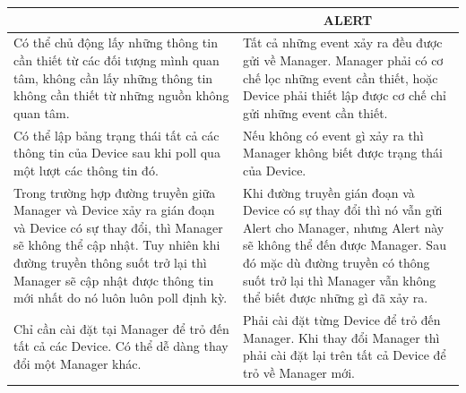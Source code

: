 \documentclass[12pt,oneside,a4paper]{article}
\begin{document}
\begin{longtable}{|p{8cm}|p{8cm}|}
\hline
\rowcolor[HTML]{EFEFEF} 
\multicolumn{1}{|c|}{\cellcolor[HTML]{EFEFEF}\textbf{POLL}}                                                                                                                                                                                                    & \multicolumn{1}{c|}{\cellcolor[HTML]{EFEFEF}\textbf{ALERT}}                                                                                                                                                                                   \\ \hline
Có thể chủ động lấy những thông tin cần thiết từ các đối tượng mình quan tâm, không cần lấy những thông tin không cần thiết từ những nguồn không quan tâm.                                                                                                     & Tất cả những event xảy ra đều được gửi về Manager. Manager phải có cơ chế lọc những event cần thiết, hoặc Device phải thiết lập được cơ chế chỉ gửi những event cần thiết.                                                                    \\ \hline
Có thể lập bảng trạng thái tất cả các thông tin của Device sau khi poll qua một lượt các thông tin đó.                                                                                                                                                         & Nếu không có event gì xảy ra thì Manager không biết được trạng thái của Device.                                                                                                                                                               \\ \hline
Trong trường hợp đường truyền giữa Manager và Device xảy ra gián đoạn và Device có sự thay đổi, thì Manager sẽ không thể cập nhật. Tuy nhiên khi đường truyền thông suốt trở lại thì Manager sẽ cập nhật được thông tin mới nhất do nó luôn luôn poll định kỳ. & Khi đường truyền gián đoạn và Device có sự thay đổi thì nó vẫn gửi Alert cho Manager, nhưng Alert này sẽ không thể đến được Manager. Sau đó mặc dù đường truyền có thông suốt trở lại thì Manager vẫn không thể biết được những gì đã xảy ra. \\ \hline
Chỉ cần cài đặt tại Manager để trỏ đến tất cả các Device. Có thể dễ dàng thay đổi một Manager khác.                                                                                                                                                            & Phải cài đặt từng Device để trỏ đến Manager. Khi thay đổi Manager thì phải cài đặt lại trên tất cả Device để trỏ về Manager mới.                                                                                                              \\ \hline

\end{longtable}
\end{document}
